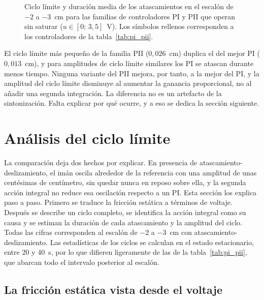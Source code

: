 \begin{figure}[ht]
    \centering
    
    \caption[Familias PI y PII]{Ciclo límite y duración media de los atascamientos en el escalón de $-2$ a $-3$~cm para las familias de controladores PI y PII que operan sin saturar ($u\in[0;\,3{,}5]$~V). Los símbolos rellenos corresponden a los controladores de la tabla~\ref{tab:pi_pii}.}
    \label{fig:r15_familias}
\end{figure}

El ciclo límite más pequeño de la familia PII ($0{,}026$~cm) duplica el del mejor PI ($0{,}013$~cm), y para amplitudes de ciclo límite similares los PI se atascan durante menos tiempo. Ninguna variante del PII mejora, por tanto, a la mejor del PI, y la amplitud del ciclo límite disminuye al aumentar la ganancia proporcional, no al añadir una segunda integración. La diferencia no es un artefacto de la sintonización. Falta explicar por qué ocurre, y a eso se dedica la sección siguiente.

\section{Análisis del ciclo límite}
\label{sec:analisis_ciclo}

La comparación deja dos hechos por explicar. En presencia de atascamiento-deslizamiento, el imán oscila alrededor de la referencia con una amplitud de unas centésimas de centímetro, sin quedar nunca en reposo sobre ella, y la segunda acción integral no reduce esa oscilación respecto a un PI. Esta sección los explica paso a paso. Primero se traduce la fricción estática a términos de voltaje. Después se describe un ciclo completo, se identifica la acción integral como su causa y se estiman la duración de cada atascamiento y la amplitud del ciclo. Todas las cifras corresponden al escalón de $-2$ a $-3$~cm con atascamiento-deslizamiento. Las estadísticas de los ciclos se calculan en el estado estacionario, entre 20 y 40~s, por lo que difieren ligeramente de las de la tabla~\ref{tab:pi_pii}, que abarcan todo el intervalo posterior al escalón.

\subsection{La fricción estática vista desde el voltaje}

